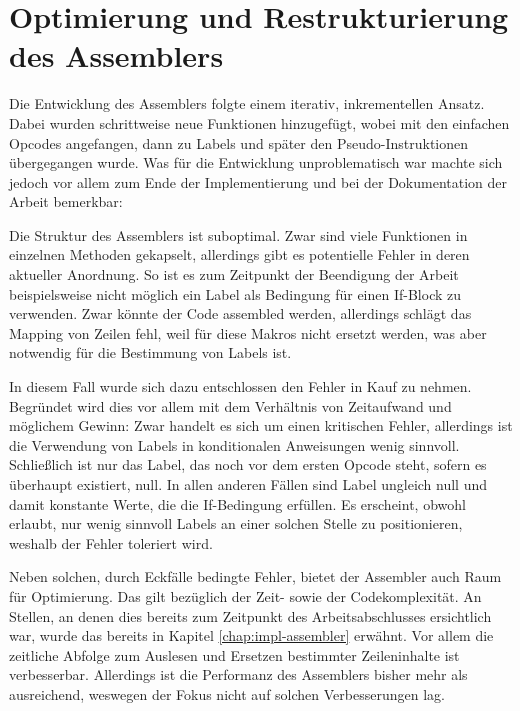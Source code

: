 \section{Optimierung und Restrukturierung des Assemblers}

Die Entwicklung des Assemblers folgte einem iterativ, inkrementellen Ansatz. Dabei wurden schrittweise neue Funktionen hinzugefügt, wobei mit den einfachen Opcodes angefangen, dann zu Labels und später den Pseudo-Instruktionen übergegangen wurde. Was für die Entwicklung unproblematisch war machte sich jedoch vor allem zum Ende der Implementierung und bei der Dokumentation der Arbeit bemerkbar:

Die Struktur des Assemblers ist suboptimal. Zwar sind viele Funktionen in einzelnen Methoden gekapselt, allerdings gibt es potentielle Fehler in deren aktueller Anordnung. So ist es zum Zeitpunkt der Beendigung der Arbeit beispielsweise nicht möglich ein Label als Bedingung für einen If-Block zu verwenden. Zwar könnte der Code assembled werden, allerdings schlägt das Mapping von Zeilen fehl, weil für diese Makros nicht ersetzt werden, was aber notwendig für die Bestimmung von Labels ist.

In diesem Fall wurde sich dazu entschlossen den Fehler in Kauf zu nehmen. Begründet wird dies vor allem mit dem Verhältnis von Zeitaufwand und möglichem Gewinn: Zwar handelt es sich um einen kritischen Fehler, allerdings ist die Verwendung von Labels in konditionalen Anweisungen wenig sinnvoll. Schließlich ist nur das Label, das noch vor dem ersten Opcode steht, sofern es überhaupt existiert, null. In allen anderen Fällen sind Label ungleich null und damit konstante Werte, die die If-Bedingung erfüllen. Es erscheint, obwohl erlaubt, nur wenig sinnvoll Labels an einer solchen Stelle zu positionieren, weshalb der Fehler toleriert wird.

Neben solchen, durch Eckfälle bedingte Fehler, bietet der Assembler auch Raum für Optimierung. Das gilt bezüglich der Zeit- sowie der Codekomplexität. An Stellen, an denen dies bereits zum Zeitpunkt des Arbeitsabschlusses ersichtlich war, wurde das bereits in Kapitel \ref{chap:impl-assembler} erwähnt. Vor allem die zeitliche Abfolge zum Auslesen und Ersetzen bestimmter Zeileninhalte ist verbesserbar. Allerdings ist die Performanz des Assemblers bisher mehr als ausreichend, weswegen der Fokus nicht auf solchen Verbesserungen lag.
